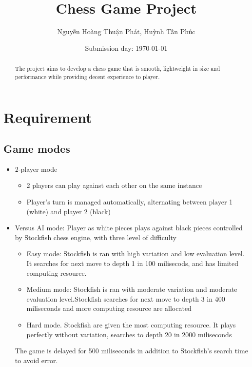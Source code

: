 \documentclass[a4paper, 10pt, titlepage]{report}
\title{Chess Game Project}
\author{Nguyễn Hoàng Thuận Phát, Huỳnh Tấn Phúc}
\date{Submission day: \selectlanguage{english}\today}
\begin{document}
\maketitle
{}
\renewcommand{\abstractname}{Overview}
\begin{abstract}
  The project aims to develop a chess game that is smooth, lightweight in size and performance while providing decent experience to player.
\end{abstract}

\tableofcontents
\chapter{Requirement}

\section{Game modes}
\begin{itemize}
  \item 2-player mode
        \begin{itemize}
          \item 2 players can play against each other on the same instance
          \item Player's turn is managed automatically, alternating between player 1 (white) and player 2 (black)
        \end{itemize}
  \item Versus AI mode: Player as white pieces plays against black pieces controlled by Stockfish chess engine, with three level of difficulty
        \begin{itemize}
          \item Easy mode: Stockfish is ran with high variation and low evaluation level. It searches for next move to depth 1 in 100 milisecods, and has limited computing resource.
          \item Medium mode: Stockfish is ran with moderate variation and moderate evaluation level.Stockfish searches for next move to depth 3 in 400 miliseconds and more computing resource are allocated
          \item Hard mode. Stockfish are given the most computing resource. It plays perfectly without variation, searches to depth 20 in 2000 miliseconds
        \end{itemize}
        The game is delayed for 500 miliseconds in addition to Stockfish's search time to avoid error.
\end{itemize}
\end{document}
